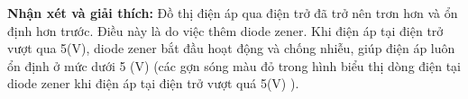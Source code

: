 \textbf{Nhận xét và giải thích:} Đồ thị điện áp qua điện trở đã trở nên trơn hơn và ổn định hơn trước. Điều này là do việc thêm diode zener. Khi điện áp tại điện trở vượt qua 5(V), diode zener bắt đầu hoạt động và chống nhiễu, giúp điện áp luôn ổn định ở mức dưới 5 (V) (các gợn sóng màu đỏ trong hình biểu thị dòng điện tại diode zener khi điện áp tại điện trở vượt quá 5(V) ).




